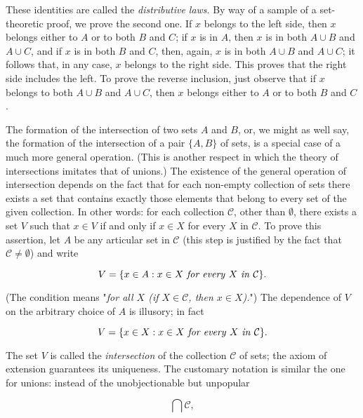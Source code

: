 These identities are called the \textit{distributive laws}. By way of a sample of a set-theoretic proof, we prove the second one. If $x$ belongs to the left side, then $x$ belongs either to $A$ or to both $B$ and $C$; if $x$ is in $A$, then $x$ is in both $A \cup B$ and $A \cup C$, and if $x$ is in both $B$ and $C$, then, again, $x$ is in both $A \cup B$ and $A \cup C$; it follows that, in any case, $x$ belongs to the right side. This proves that the right side includes the left. To prove the reverse inclusion, just observe that if $x$ belongs to both $A \cup B$ and $A \cup C$, then $x$ belongs either to $A$ or to both $B$ and $C$. 

The formation of the intersection of two sets $A$ and $B$, or, we might as well say, the formation of the intersection of a pair $ \{ A, B \} $ of sets, is a special case of a much more general operation. (This is another respect in which the theory of intersections imitates that of unions.) The existence of the general operation of intersection depends on the fact that for each non-empty collection of sets there exists a set that contains exactly those elements that belong to every set of the given collection. In other words: for each collection $\mathcal{C}$, other than $ \emptyset $, there exists a set $V$ such that $x \in V$ if and only if $x \in X$ for every $X$ in $\mathcal{C}$. To prove this assertion, let $A$ be any articular set in $\mathcal{C}$ (this step is justified by the fact that $\mathcal{C} \neq \emptyset$) and write

\begin{equation*}
V = \{ x \in A: x \in X \text{ \textit{for every} } X \text{ \textit{in} } \mathcal{C} \}.
\end{equation*}

(The condition means "\textit{for all $X$ (if $X \in \mathcal{C}$, then $x \in X$).}") The dependence of $V$ on the arbitrary choice of $A$ is illusory; in fact

\begin{equation*}
V = \{ x \in X: x \in X \text{ \textit{for every} } X \text{ \textit{in} } \mathcal{C} \}.
\end{equation*}


The set $V$ is called the \textit{intersection} of the collection $ \mathcal{C} $ of sets; the axiom of extension guarantees its uniqueness. The customary notation is similar the one for unions: instead of the unobjectionable but unpopular

\begin{equation*}
\bigcap \mathcal{C} ,
\end{equation*}

